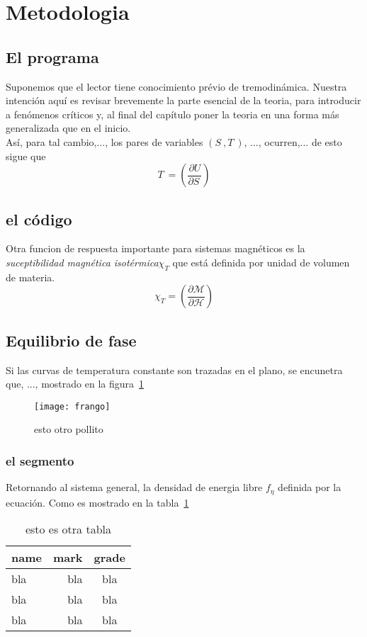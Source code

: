 \newpage 
 \section{Metodologia}
  \subsection{El programa}
   Suponemos que el lector tiene conocimiento prévio de tremodinámica.
   Nuestra intención aquí es revisar brevemente la parte esencial de la
   teoria, para introducir a fenómenos críticos y, al final del capítulo
   poner la teoria en una forma más generalizada que en el inicio.\\

   Así, para tal cambio,..., los pares de variables $(S^{~},T^{~})$, ...,
   ocurren,... de esto sigue que
   \begin{equation}
     T^{~}=\left(\frac{\partial U}{\partial S^{~}}\right)
   \end{equation}

   \subsection{el código}
    Otra funcion de respuesta importante para sistemas magnéticos es la 
    \textit{suceptibilidad magnética isotérmica}$\chi_{T}$ que está definida
    por unidad de volumen de materia.
    \begin{equation}
      \chi_{T}=\left(\frac{\partial \mathcal{M}}{\partial \mathcal{H}}\right)
    \end{equation}
    \subsection{Equilibrio de fase}
    Si las curvas de temperatura constante son trazadas en el plano, se encunetra que, ..., mostrado en la figura~\ref{fig:pollitos}
    \begin{figure}[!h]
      \centering
      \texttt{[image: frango]}
      \caption{esto otro pollito}
      \label{fig:pollitos}
    \end{figure}  
    \subsubsection{el segmento}
    Retornando al sistema general, la densidad de energia libre $f_{\eta}$ definida por la ecuación. Como es mostrado en la tabla~\ref{tab:b}
    \begin{table}[!htb]
        \begin{tabular}{lrc}\hline
          name & mark & grade \\
          \hline
          bla & bla & bla \\
          bla & bla & bla \\
          bla & bla & bla \\ \hline
        \end{tabular}
        \caption{esto es otra tabla}\label{tab:b}
    \end{table}
    \newpage

